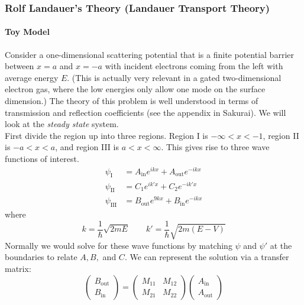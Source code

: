 \documentclass{article}
\begin{document}
		\subsubsection{Rolf Landauer's Theory (Landauer Transport Theory)}
		\paragraph{Toy Model} Consider a one-dimensional scattering potential that is a finite potential barrier between $x=a$ and $x=-a$ with incident electrons coming from the left with average energy $E$. (This is actually very relevant in a gated two-dimensional electron gas, where the low energies only allow one mode on the surface dimension.) The theory of this problem is well understood in terms of transmission and reflection coefficients (see the appendix in Sakurai). We will look at the \emph{steady state} system.\\
		
		\noindent First divide the region up into three regions. Region I is $-\infty<x<-1$, region II is $-a<x<a$, and region III is $a<x<\infty$. This gives rise to three wave functions of interest.
		\begin{align*}
			\psi_{\mathrm{I}}&=A_{\mathrm{in}}e^{ikx}+A_{\mathrm{out}}e^{-ikx}\\
			\psi_{\mathrm{II}}&=C_1e^{ik'x}+C_2e^{-ik'x}\\
			\psi_{\mathrm{III}}&=B_{\mathrm{out}}e^{9kx}+B_{\mathrm{in}}e^{-ikx}
		\end{align*}
		where $$k=\frac{1}{\hbar}\sqrt{2mE}\qquad k'=\frac{1}{\hbar}\sqrt{2m(E-V)}$$
Normally we would solve for these wave functions by matching $\psi$ and $\psi'$ at the boundaries to relate $A,B,$ and $C$. We can represent the solution via a transfer matrix:
$$\left(\begin{array}{c}B_{\mathrm{out}} \\B_{\mathrm{in}}\end{array}\right)=\left(\begin{array}{cc}M_{11} & M_{12} \\M_{21} & M_{22}\end{array}\right)\left(\begin{array}{c}A_{\mathrm{in}} \\A_{\mathrm{out}}\end{array}\right)$$
\end{document}
